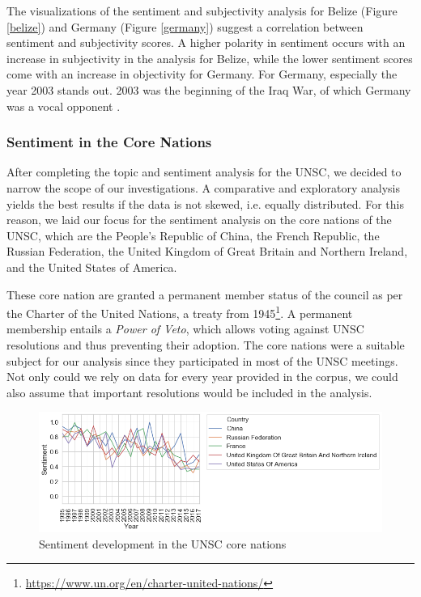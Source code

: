 The visualizations of the sentiment and subjectivity analysis for Belize (Figure \ref{belize}) and Germany (Figure \ref{germany}) suggest a correlation between sentiment and subjectivity scores. A higher polarity in sentiment occurs with an increase in subjectivity in the analysis for Belize, while the lower sentiment scores come with an increase in objectivity for Germany. For Germany, especially the year 2003 stands out. 2003 was the beginning of the Iraq War, of which Germany was a vocal opponent \citep{germiraq}.

\subsubsection{Sentiment in the Core Nations}
After completing the topic and sentiment analysis for the UNSC, we decided to narrow the scope of our investigations. A comparative and exploratory analysis yields the best results if the data is not skewed, i.e. equally distributed. For this reason, we laid our focus for the sentiment analysis on the core nations of the UNSC, which are the People's Republic of China, the French Republic, the Russian Federation, the United Kingdom of Great Britain and Northern Ireland, and the United States of America.

These core nation are granted a permanent member status of the council as per the Charter of the United Nations, a treaty from 1945\footnote{\href{https://www.un.org/en/charter-united-nations/}{https://www.un.org/en/charter-united-nations/}}. A permanent membership entails a \textit{Power of Veto}, which allows voting against UNSC resolutions and thus preventing their adoption. 
The core nations were a suitable subject for our analysis since they participated in most of the UNSC meetings. Not only could we rely on data for every year provided in the corpus, we could also assume that important resolutions would be included in the analysis.

\begin{figure}[h]
  \centering
  \includegraphics[width=14.75cm]{img/over_time_Vader_Sentiment.png}
  \caption{Sentiment development in the UNSC core nations}
  \label{fig:vadercore}
\end{figure}%

